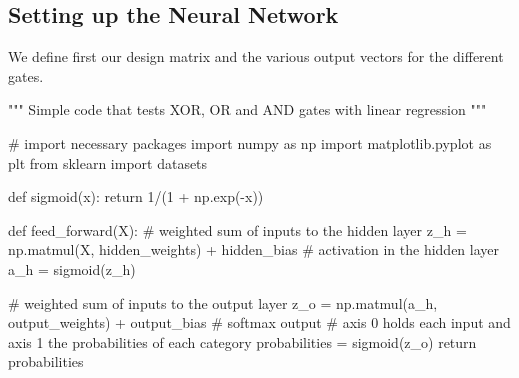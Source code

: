 \documentclass[%
oneside,                 %
final,                   %
10pt]{article}
\begin{document}
\subsection{Setting up the Neural Network}

We define first our design matrix and the various output vectors for the different gates.




































































\bpycod
"""
Simple code that tests XOR, OR and AND gates with linear regression
"""

# import necessary packages
import numpy as np
import matplotlib.pyplot as plt
from sklearn import datasets

def sigmoid(x):
    return 1/(1 + np.exp(-x))

def feed_forward(X):
    # weighted sum of inputs to the hidden layer
    z_h = np.matmul(X, hidden_weights) + hidden_bias
    # activation in the hidden layer
    a_h = sigmoid(z_h)
    
    # weighted sum of inputs to the output layer
    z_o = np.matmul(a_h, output_weights) + output_bias
    # softmax output
    # axis 0 holds each input and axis 1 the probabilities of each category
    probabilities = sigmoid(z_o)
    return probabilities
\end{document}
